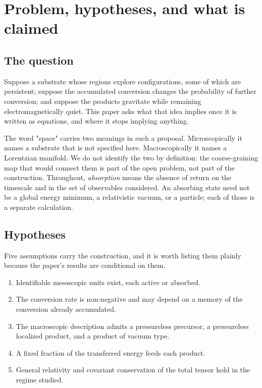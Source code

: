 \section{Problem, hypotheses, and what is claimed}\label{sec:intro}

\subsection{The question}\label{sec:intro-question}

Suppose a substrate whose regions explore configurations, some of which are
persistent; suppose the accumulated conversion changes the probability of
further conversion; and suppose the products gravitate while remaining
electromagnetically quiet. This paper asks what that idea implies once it is
written as equations, and where it stops implying anything.

The word "space" carries two meanings in such a proposal. Microscopically it
names a substrate that is not specified here. Macroscopically it names a
Lorentzian manifold. We do not identify the two by definition: the
coarse-graining map that would connect them is part of the open problem, not
part of the construction. Throughout, \emph{absorption} means the absence of
return on the timescale and in the set of observables considered. An absorbing
state need not be a global energy minimum, a relativistic vacuum, or a
particle; each of those is a separate calculation.

\subsection{Hypotheses}\label{sec:intro-hypotheses}

Five assumptions carry the construction, and it is worth listing them plainly
because the paper's results are conditional on them.

\begin{enumerate}
  \item Identifiable mesoscopic units exist, each active or absorbed.
  \item The conversion rate is non-negative and may depend on a memory of the
    conversion already accumulated.
  \item The macroscopic description admits a pressureless precursor, a
    pressureless localized product, and a product of vacuum type.
  \item A fixed fraction of the transferred energy feeds each product.
  \item General relativity and covariant conservation of the total tensor hold
    in the regime studied.
\end{enumerate}

